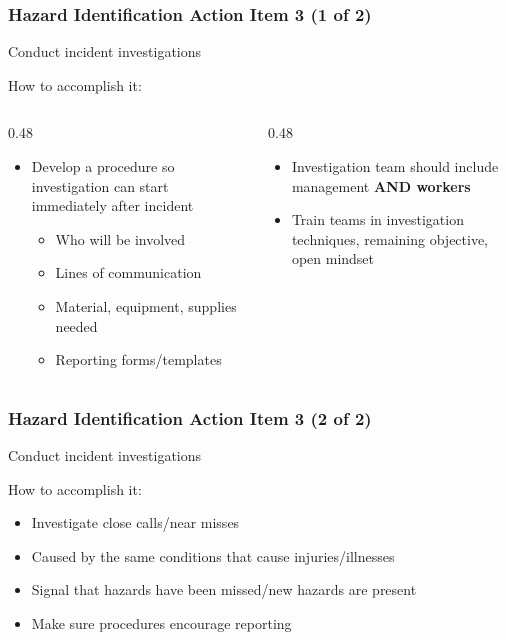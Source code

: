 \begin{frame}
	\frametitle{Hazard Identification Action Item 3 (1 of 2)}

    Conduct incident investigations

    \begin{block}{How to accomplish it:}
        \vspace{-1.5em}
        \begin{columns}[t]
            \begin{column}{0.48\linewidth}
                \begin{itemize}[<+- | alert@+>]
                    \item Develop a procedure so investigation can start immediately after incident
                    \begin{itemize}
                        \item Who will be involved
                        \item Lines of communication
                        \item Material, equipment, supplies needed
                        \item Reporting forms/templates
                    \end{itemize}
                \end{itemize}
            \end{column}
            \begin{column}{0.48\linewidth}
                \begin{itemize}[<+- | alert@+>]
                    \item Investigation team should include management \textbf{AND workers}
                    \item Train teams in investigation techniques, remaining objective, open mindset
                \end{itemize}
            \end{column}
        \end{columns}
    \end{block}    
\end{frame}

\begin{frame}
	\frametitle{Hazard Identification Action Item 3 (2 of 2)}

    Conduct incident investigations

    \begin{block}{How to accomplish it:}
        \begin{itemize}
            \item Investigate close calls/near misses
            \item Caused by the same conditions that cause injuries/illnesses
            \item Signal that hazards have been missed/new hazards are present
            \item Make sure procedures encourage reporting
        \end{itemize}
    \end{block}    
\end{frame}

